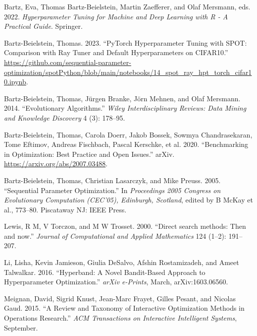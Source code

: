 \documentclass[
  letterpaper,
  DIV=11,
  numbers=noendperiod]{scrreprt}
\newlength{\cslhangindent}
\newlength{\cslentryspacingunit} %
\newenvironment{CSLReferences}[2] %
 {%
  \setlength{\parindent}{0pt}
  \ifodd #1
  \let\oldpar\par
  \def\par{\hangindent=\cslhangindent\oldpar}
  \fi
  \setlength{\parskip}{#2\cslentryspacingunit}
 }%
 {}
\begin{document}

\hypertarget{refs}{}
\begin{CSLReferences}{1}{0}
\leavevmode{}%
Bartz, Eva, Thomas Bartz-Beielstein, Martin Zaefferer, and Olaf
Mersmann, eds. 2022. \emph{{Hyperparameter Tuning for Machine and Deep
Learning with R - A Practical Guide}}. Springer.

\leavevmode{}%
Bartz-Beielstein, Thomas. 2023. {``{PyTorch} Hyperparameter Tuning with
{SPOT}: Comparison with {Ray Tuner} and Default Hyperparameters on
{CIFAR10}.''}
\url{https://github.com/sequential-parameter-optimization/spotPython/blob/main/notebooks/14_spot_ray_hpt_torch_cifar10.ipynb}.

\leavevmode{}%
Bartz-Beielstein, Thomas, Jürgen Branke, Jörn Mehnen, and Olaf Mersmann.
2014. {``Evolutionary Algorithms.''} \emph{Wiley Interdisciplinary
Reviews: Data Mining and Knowledge Discovery} 4 (3): 178--95.

\leavevmode{}%
Bartz-Beielstein, Thomas, Carola Doerr, Jakob Bossek, Sowmya
Chandrasekaran, Tome Eftimov, Andreas Fischbach, Pascal Kerschke, et al.
2020. {``Benchmarking in Optimization: Best Practice and Open Issues.''}
arXiv. \url{https://arxiv.org/abs/2007.03488}.

\leavevmode{}%
Bartz-Beielstein, Thomas, Christian Lasarczyk, and Mike Preuss. 2005.
{``{Sequential Parameter Optimization}.''} In \emph{{Proceedings 2005
Congress on Evolutionary Computation (CEC'05), Edinburgh, Scotland}},
edited by B McKay et al., 773--80. Piscataway NJ: {IEEE Press}.

\leavevmode{}%
Lewis, R M, V Torczon, and M W Trosset. 2000. {``{Direct search methods:
Then and now}.''} \emph{Journal of Computational and Applied
Mathematics} 124 (1--2): 191--207.

\leavevmode{}%
Li, Lisha, Kevin Jamieson, Giulia DeSalvo, Afshin Rostamizadeh, and
Ameet Talwalkar. 2016. {``{Hyperband: A Novel Bandit-Based Approach to
Hyperparameter Optimization}.''} \emph{arXiv e-Prints}, March,
arXiv:1603.06560.

\leavevmode{}%
Meignan, David, Sigrid Knust, Jean-Marc Frayet, Gilles Pesant, and
Nicolas Gaud. 2015. {``{A Review and Taxonomy of Interactive
Optimization Methods in Operations Research}.''} \emph{ACM Transactions
on Interactive Intelligent Systems}, September.


\end{CSLReferences}
\end{document}
